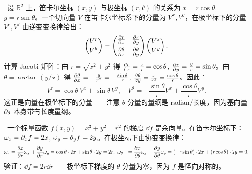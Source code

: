 \
设 $\mathbb{R}^2$ 上，笛卡尔坐标 $(x, y)$ 与极坐标 $(r, \theta)$ 的关系为 $x = r\cos\theta$, $y = r\sin\theta$。一个切向量 $V$ 在笛卡尔坐标系下的分量为 $V^x, V^y$，在极坐标下的分量 $V^r, V^\theta$ 由逆变变换律给出：
\begin{equation}
    \begin{pmatrix} V^r \\[2pt] V^\theta \end{pmatrix}
    = \begin{pmatrix}
        \frac{\partial r}{\partial x} & \frac{\partial r}{\partial y} \\[6pt]
        \frac{\partial \theta}{\partial x} & \frac{\partial \theta}{\partial y}
    \end{pmatrix}
    \begin{pmatrix} V^x \\[2pt] V^y \end{pmatrix}.
\end{equation}
计算 Jacobi 矩阵：由 $r = \sqrt{x^2 + y^2}$ 得 $\frac{\partial r}{\partial x} = \frac{x}{r} = \cos\theta$, $\frac{\partial r}{\partial y} = \frac{y}{r} = \sin\theta$。由 $\theta = \arctan(y/x)$ 得 $\frac{\partial \theta}{\partial x} = -\frac{y}{r^2} = -\frac{\sin\theta}{r}$, $\frac{\partial \theta}{\partial y} = \frac{x}{r^2} = \frac{\cos\theta}{r}$。因此：
\begin{equation}
    \boxed{V^r = \cos\theta \, V^x + \sin\theta \, V^y, \quad V^\theta = -\frac{\sin\theta}{r} V^x + \frac{\cos\theta}{r} V^y}.
\end{equation}
这正是向量在极坐标下的分量——注意 $\theta$ 分量的量纲是 $\text{radian}/\text{长度}$，因为基向量 $\partial_\theta$ 本身带有长度量纲。

\
一个标量函数 $f(x,y) = x^2 + y^2 = r^2$ 的梯度 $\dd f$ 是余向量。在笛卡尔坐标下：$\omega_x = \partial_x f = 2x$, $\omega_y = \partial_y f = 2y$。在极坐标下由协变变换律：
\begin{equation}
    \begin{aligned}
        \omega_r &= \frac{\partial x}{\partial r} \omega_x + \frac{\partial y}{\partial r} \omega_y = \cos\theta \cdot 2x + \sin\theta \cdot 2y = 2r, \
        \omega_\theta &= \frac{\partial x}{\partial \theta} \omega_x + \frac{\partial y}{\partial \theta} \omega_y = (-r\sin\theta) \cdot 2x + (r\cos\theta) \cdot 2y = 0.
    \end{aligned}
\end{equation}
验证：$\dd f = 2r \dd r$——极坐标下梯度的 $\theta$ 分量为零，因为 $f$ 是径向对称的。

